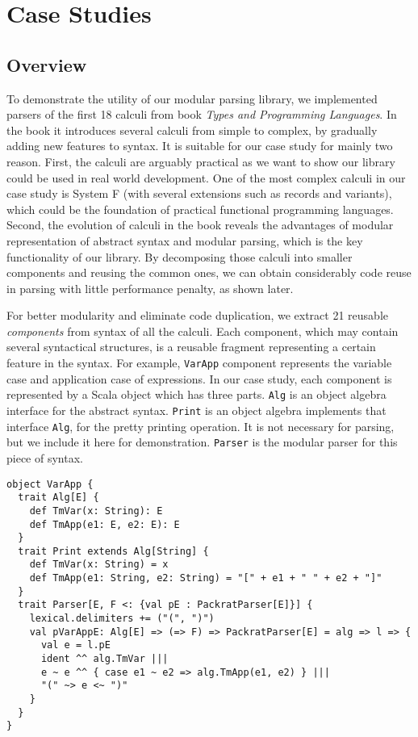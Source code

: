\section{Case Studies}\label{sec:casestudy}

\subsection{Overview}\label{subsec:overview}

To demonstrate the utility of our modular parsing library, we implemented parsers of the first 18 calculi from book \textit{Types and Programming Languages}. In the book it introduces several calculi from simple to complex, by gradually adding new features to syntax. It is suitable for our case study for mainly two reason. First, the calculi are arguably practical as we want to show our library could be used in real world development. One of the most complex calculi in our case study is System F (with several extensions such as records and variants), which could be the foundation of practical functional programming languages. Second, the evolution of calculi in the book reveals the advantages of modular representation of abstract syntax and modular parsing, which is the key functionality of our library. By decomposing those calculi into smaller components and reusing the common ones, we can obtain considerably code reuse in parsing with little performance penalty, as shown later.

For better modularity and eliminate code duplication, we extract 21 reusable \textit{components} from syntax of all the calculi. Each component, which may contain several syntactical structures, is a reusable fragment representing a certain feature in the syntax. For example, \lstinline{VarApp} component represents the variable case and application case of expressions. In our case study, each component is represented by a Scala object which has three parts. \lstinline{Alg} is an object algebra interface for the abstract syntax. \lstinline{Print} is an object algebra implements that interface \lstinline{Alg}, for the pretty printing operation. It is not necessary for parsing, but we include it here for demonstration. \lstinline{Parser} is the modular parser for this piece of syntax.

\begin{lstlisting}
object VarApp {
  trait Alg[E] {
    def TmVar(x: String): E
    def TmApp(e1: E, e2: E): E
  }
  trait Print extends Alg[String] {
    def TmVar(x: String) = x
    def TmApp(e1: String, e2: String) = "[" + e1 + " " + e2 + "]"
  }
  trait Parser[E, F <: {val pE : PackratParser[E]}] {
    lexical.delimiters += ("(", ")")
    val pVarAppE: Alg[E] => (=> F) => PackratParser[E] = alg => l => {
      val e = l.pE
      ident ^^ alg.TmVar |||
      e ~ e ^^ { case e1 ~ e2 => alg.TmApp(e1, e2) } |||
      "(" ~> e <~ ")"
    }
  }
}
\end{lstlisting}

